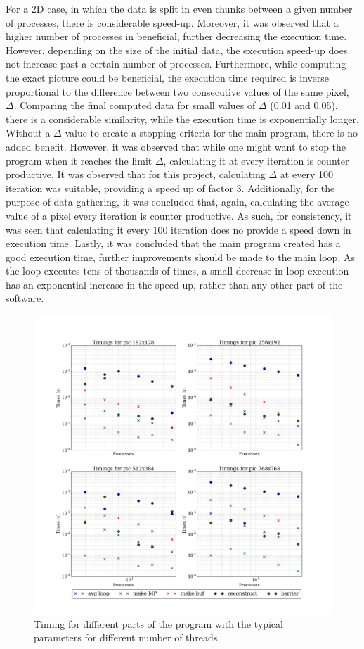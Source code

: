 \documentclass[11pt]{article}
\begin{document}
	For a 2D case, in which the data is split in even chunks between a given number of processes, there is considerable speed-up. Moreover, it was observed that a higher number of processes in beneficial, further decreasing the execution time. However, depending on the size of the initial data, the execution speed-up does not increase past a certain number of processes. Furthermore, while computing the exact picture could be beneficial, the execution time required is inverse proportional to the difference between two consecutive values of the same pixel, $\Delta$. Comparing the final computed data for small values of $\Delta$ (0.01 and 0.05), there is a considerable similarity, while the execution time is exponentially longer. Without a $\Delta$ value to create a stopping criteria for the main program, there is no added benefit. However, it was observed that while one might want to stop the program when it reaches the limit $\Delta$, calculating it at every iteration is counter productive. It was observed that for this project, calculating $\Delta$ at every 100 iteration was suitable, providing a speed up of factor 3. Additionally, for the purpose of data gathering, it was concluded that, again, calculating the average value of a pixel every iteration is counter productive. As such, for consistency, it was seen that calculating it every 100 iteration does no provide a speed down in execution time. Lastly, it was concluded that the main program created has a good execution time, further improvements should be made to the main loop. As the loop executes tens of thousands of times, a small decrease in loop execution has an exponential increase in the speed-up, rather than any other part of the software.
	
	\begin{figure}[H]	
		\centering
		\includegraphics[scale=.3, width=\textwidth ]{timings.jpeg}
		\caption{Timing for different parts of the program with the typical parameters for different number of threads.}\label{tim1}
	\end{figure}
\end{document}
